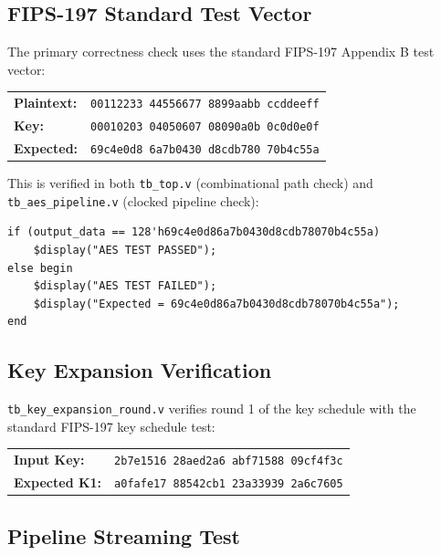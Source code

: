 \documentclass[12pt,a4paper]{article}
\begin{document}
\subsection{FIPS-197 Standard Test Vector}

The primary correctness check uses the standard FIPS-197 Appendix B test vector:

\begin{infobox}
\begin{tabular}{ll}
\textbf{Plaintext:} & \texttt{00112233 44556677 8899aabb ccddeeff}\\
\textbf{Key:}       & \texttt{00010203 04050607 08090a0b 0c0d0e0f}\\
\textbf{Expected:}  & \texttt{69c4e0d8 6a7b0430 d8cdb780 70b4c55a}\\
\end{tabular}
\end{infobox}

This is verified in both \texttt{tb\_top.v} (combinational path check) and
\texttt{tb\_aes\_pipeline.v} (clocked pipeline check):

\begin{lstlisting}[caption={Pass/fail check in tb\_top.v}]
if (output_data == 128'h69c4e0d86a7b0430d8cdb78070b4c55a)
    $display("AES TEST PASSED");
else begin
    $display("AES TEST FAILED");
    $display("Expected = 69c4e0d86a7b0430d8cdb78070b4c55a");
end
\end{lstlisting}

\subsection{Key Expansion Verification}

\texttt{tb\_key\_expansion\_round.v} verifies round 1 of the key schedule
with the standard FIPS-197 key schedule test:

\begin{infobox}
\begin{tabular}{ll}
\textbf{Input Key:}   & \texttt{2b7e1516 28aed2a6 abf71588 09cf4f3c}\\
\textbf{Expected K1:} & \texttt{a0fafe17 88542cb1 23a33939 2a6c7605}\\
\end{tabular}
\end{infobox}

\subsection{Pipeline Streaming Test}
\end{document}
